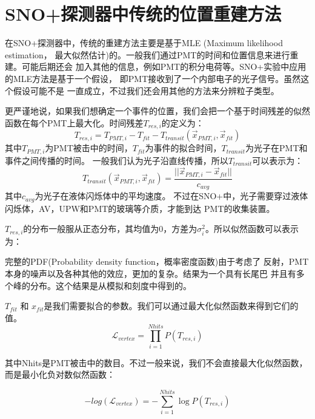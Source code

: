 \section{SNO+探测器中传统的位置重建方法}\label{sec:classical_reconstruction}

在SNO+探测器中，传统的重建方法主要是基于MLE (Maximum likelihood estimation，
最大似然估计)的。一般我们通过PMT的时间和位置信息来进行重建。可能后期还会
加入其他的信息，例如PMT的积分电荷等。SNO+实验中应用的MLE方法是基于一个假设，
即PMT接收到了一个内部电子的光子信号。\cite{anderson2024}虽然这个假设可能不是
一直成立，不过我们还会用其他的方法来分辨粒子类型。

更严谨地说，如果我们想确定一个事件的位置，我们会把一个基于时间残差的似然
函数在每个PMT上最大化。时间残差$T_{res,i}$的定义为：
\begin{equation}
T_{res,i} = T_{PMT,i}-T_{fit}-T_{transit}(\vec{x}_{PMT,i},\vec{x}_{fit})
\label{eq:residual}
\end{equation}
其中$T_{PMT,i}$为PMT被击中的时间，$T_{fit}$为事件的拟合时间，$T_{transit}$为光子在PMT和事件之间传播的时间。
一般我们认为光子沿直线传播，所以$T_{transit}$可以表示为：
\begin{equation}
T_{transit}(\vec{x}_{PMT,i},\vec{x}_{fit}) = \frac{||\vec{x}_{PMT,i}-\vec{x}_{fit}||}{c_{avg}}
\end{equation}
其中$c_{avg}$为光子在液体闪烁体中的平均速度。
不过在SNO+中，光子需要穿过液体闪烁体，AV，UPW和PMT的玻璃等介质，才能到达
PMT的收集装置。

$T_{res,i}$的分布一般服从正态分布，其均值为0，方差为$\sigma_{i}^2$。所以似然函数可以表示为：

完整的PDF(Probability density function，概率密度函数)由于考虑了
反射，PMT本身的噪声以及各种其他的效应，更加的复杂。结果为一个具有长尾巴
并且有多个峰的分布。这个结果是从模拟和刻度中得到的。\cite{anderson2024}

$T_{fit}$ 和 $x_{fit}$是我们需要拟合的参数。我们可以通过最大化似然函数来得到它们的值。
\begin{equation}
\mathcal{L}_{vertex} = \prod_{i=1}^{Nhits} P(T_{res,i})
\end{equation}

其中Nhits是PMT被击中的数目。不过一般来说，我们不会直接最大化似然函数，而是最小化负对数似然函数：

\begin{equation}
-log(\mathcal{L}_{vertex}) = -\sum_{i=1}^{Nhits} \log P(T_{res,i})
\label{MLE}
\end{equation}

